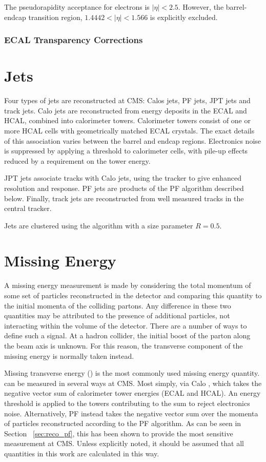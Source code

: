 The pseudorapidity acceptance for electrons is $|\eta| < 2.5$. However, the
barrel-endcap transition region, $1.4442 < |\eta| < 1.566$ is explicitly excluded.



\subsubsection{\ac{ECAL} Transparency Corrections}
\label{sec:reco_ecal_transparency}
\section{Jets}
Four types of jets are reconstructed at \ac{CMS}: \acp{Calo} jets, \ac{PF} jets,
\ac{JPT} jets and track jets. \ac{Calo} jets are reconstructed from energy
deposits in the \ac{ECAL} and \ac{HCAL}, combined into calorimeter
towers. Calorimeter towers consist of one or more \ac{HCAL} cells with
geometrically matched \ac{ECAL} crystals. The exact details of this association
varies between the barrel and endcap regions. Electronics noise is suppressed by
applying a threshold to calorimeter cells, with pile-up effects reduced by a
requirement on the tower energy.

\ac{JPT} jets associate tracks with \ac{Calo} jets, using the tracker to give
enhanced \Pt resolution and response. \ac{PF} jets are products of the \acl{PF}
algorithm described below. Finally, track jets are reconstructed from well
measured tracks in the central tracker.

Jets are clustered using the \antiKT algorithm \cite{antiKT} with a size
parameter $R=0.5$.

\section{Missing Energy}
A missing energy measurement is made by considering the total momentum of some
set of particles reconstructed in the detector and comparing this quantity to
the initial momenta of the colliding partons. Any difference in these two
quantities may be attributed to the presence of additional particles, not
interacting within the volume of the detector. There are a number of ways to
define such a signal. At a hadron collider, the initial boost of the parton
along the beam axis is unknown. For this reason, the transverse component of the
missing energy is normally taken instead.

Missing transverse energy (\MET) is the most commonly used missing energy
quantity. \MET can be measured in several ways at \ac{CMS}. Most simply, via
\ac{Calo} \MET, which takes the negative vector sum of calorimeter tower
energies (\ac{ECAL} and \ac{HCAL}). An energy threshold is applied to the towers
contributing to the sum to reject electronics noise. Alternatively, \ac{PF} \MET
instead takes the negative vector sum over the momenta of particles
reconstructed according to the \acl{PF} algorithm. As can be seen in Section~
\ref{sec:reco_pf}, this has been shown to provide the most sensitive \MET
measurement at \ac{CMS}. Unless explicitly noted, it should be assumed that all
\MET quantities in this work are calculated in this way.

